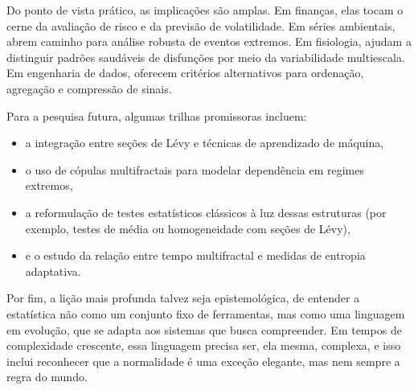 \documentclass[
]{agujournal2019}
\providecommand{\tightlist}{%
  \setlength{\itemsep}{0pt}\setlength{\parskip}{0pt}}\usepackage{longtable,booktabs,array}
\begin{document}
Do ponto de vista prático, as implicações são amplas. Em finanças, elas
tocam o cerne da avaliação de risco e da previsão de volatilidade. Em
séries ambientais, abrem caminho para análise robusta de eventos
extremos. Em fisiologia, ajudam a distinguir padrões saudáveis de
disfunções por meio da variabilidade multiescala. Em engenharia de
dados, oferecem critérios alternativos para ordenação, agregação e
compressão de sinais.

Para a pesquisa futura, algumas trilhas promissoras incluem:

\begin{itemize}
\tightlist
\item
  a integração entre seções de Lévy e técnicas de aprendizado de
  máquina,
\item
  o uso de cópulas multifractais para modelar dependência em regimes
  extremos,
\item
  a reformulação de testes estatísticos clássicos à luz dessas
  estruturas (por exemplo, testes de média ou homogeneidade com seções
  de Lévy),
\item
  e o estudo da relação entre tempo multifractal e medidas de entropia
  adaptativa.
\end{itemize}

Por fim, a lição mais profunda talvez seja epistemológica, de entender a
estatística não como um conjunto fixo de ferramentas, mas como uma
linguagem em evolução, que se adapta aos sistemas que busca compreender.
Em tempos de complexidade crescente, essa linguagem precisa ser, ela
mesma, complexa, e isso inclui reconhecer que a normalidade é uma
exceção elegante, mas nem sempre a regra do mundo.
\end{document}
